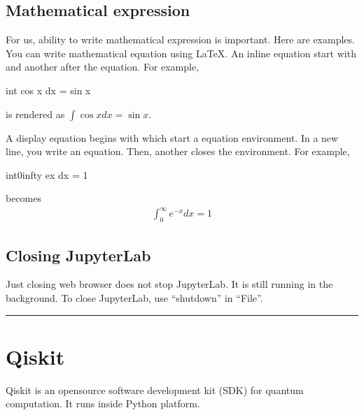 \documentclass[letterpaper,10pt,english]{jupyterBook}
\begin{document}
\subsection{Mathematical expression}
\label{\detokenize{preparation/jupyter:mathematical-expression}}
\sphinxAtStartPar
For us, ability to write mathematical expression is important.  Here are examples.  You can write mathematical equation using LaTeX.  An in\sphinxhyphen{}line equation start with \sphinxcode{\sphinxupquote{\$}} and another \sphinxcode{\sphinxupquote{\$}} after the equation. For example,

\begin{sphinxVerbatim}[commandchars=\\\{\}]
\PYGZdl{} \PYGZbs{}int \PYGZbs{}cos x dx = \PYGZbs{}sin x\PYGZdl{}
\end{sphinxVerbatim}

\sphinxAtStartPar
is rendered as \( \int \cos x dx = \sin x\).

\sphinxAtStartPar
A display equation begins with \sphinxcode{\sphinxupquote{\$\$}} which start a equation environment.  In a new line, you write an equation.  Then, another \sphinxcode{\sphinxupquote{\$\$}} closes the environment.  For example,

\begin{sphinxVerbatim}[commandchars=\\\{\}]
\PYGZdl{}\PYGZdl{}
\PYGZbs{}int\PYGZus{}0\PYGZca{}\PYGZbs{}infty e\PYGZca{}\PYGZob{}\PYGZhy{}x\PYGZcb{} dx = 1
\PYGZdl{}\PYGZdl{}
\end{sphinxVerbatim}

\sphinxAtStartPar
becomes
\begin{equation*}
\begin{split}
\int_0^\infty e^{-x} dx = 1
\end{split}
\end{equation*}

\subsection{Closing JupyterLab}
\label{\detokenize{preparation/jupyter:closing-jupyterlab}}
\sphinxAtStartPar
Just closing web browser does not stop JupyterLab.  It is still running in the background.  To close JupyterLab, use “shutdown” in “File”.


\bigskip\hrule\bigskip


\sphinxstepscope


\section{Qiskit}
\label{\detokenize{preparation/qiskit:qiskit}}\label{\detokenize{preparation/qiskit:sec-qiskit}}\label{\detokenize{preparation/qiskit::doc}}
\sphinxAtStartPar
Qiskit is an open\sphinxhyphen{}source software development kit (SDK) for quantum computation. It runs inside Python platform.
\end{document}
